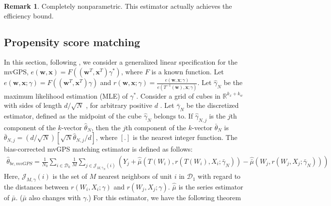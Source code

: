 \documentclass[11pt]{article}
\numberwithin{equation}{section}
\theoremstyle{definition}
\newtheorem{remark}{Remark}[section]
\begin{document}
\begin{remark}
    Completely nonparametric. This estimator actually achieves the efficiency bound.
\end{remark}
\subsection{Propensity score matching}
In this section, following \cite{abadie2016matching}, we consider a generalized linear specification for the mvGPS, $e(\mathbf{w},\mathbf{x})=F\left((\mathbf{w}^{T},\mathbf{x}^{T})\gamma^*\right)$, where $F$ is a known function. Let $e(\mathbf{w},\mathbf{x};\gamma)=F\left((\mathbf{w}^{T},\mathbf{x}^{T})\gamma\right)$ and $r(\mathbf{w},\mathbf{x};\gamma)=\frac{e(\mathbf{w},\mathbf{x};\gamma)}{e(T^{-1}(\mathbf{w}),\mathbf{x};\gamma)}$. Let $\widehat{\gamma}_N$ be the maximum likelihood estimation (MLE) of $\gamma^*$. Consider a grid of cubes in  $\mathbb{R}^{k_x+k_w}$  with sides of length  $ d/ \sqrt{N}$ , for arbitrary positive  $d$ . Let  $\bar{\gamma}_{N}$  be the discretized estimator, defined as the midpoint of the cube  $\widehat{\gamma}_{N}$  belongs to. If  $\widehat{\gamma}_{N, j}$  is the  $j$th component of the  $k$-vector  $\widehat{\theta}_{N}$, then the  $j$th component of the  $k$-vector $\bar{\theta}_{N}$  is  $\bar{\theta}_{N, j}=(d / \sqrt{N})\left[\sqrt{N} \widehat{\theta}_{N, j} / d\right]$, where $[.]$ is the nearest integer function. The bias-corrected mvGPS matching estimator is defined as follows:
\begin{align}
\widehat{\theta}_{bc,mvGPS}=\frac{1}{N_0}\sum_{i \in \mathcal{D}_0}\frac{1}{M}\sum_{j\in\mathcal{J}_{M,\bar{\gamma}_N}(i)}(Y_{j}+\widehat{\bar{\mu}}(T(W_i),r(T(W_i),X_i;\bar{\gamma}_N))-\widehat{\bar{\mu}}(W_{j},r(W_{j},X_{j};\bar{\gamma}_N)))
\end{align}
Here, $\mathcal{J}_{M,\gamma}(i)$ is the set of $M$ nearest neighbors of unit $i$ in $\mathcal{D}_1$ with regard to the distances between $r(W_i,X_i;\gamma)$ and $r(W_j,X_j;\gamma)$. $\widehat{\bar{\mu}}$ is the series estimator of $\bar{\mu}$. ($\bar{\mu}$ also changes with $\gamma$.) For this estimator, we have the following theorem
\end{document}
